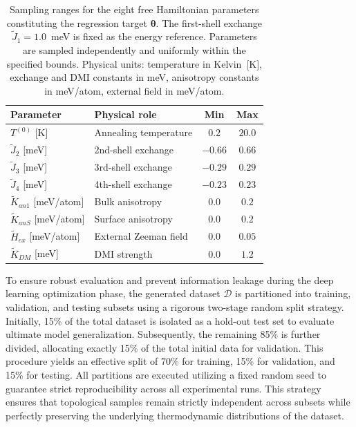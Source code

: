 \documentclass[a4paper,fleqn]{cas-sc}
\begin{document}
\begin{table}[pos=htbp]
\centering
\caption{Sampling ranges for the eight free Hamiltonian 
parameters constituting the regression target 
$\boldsymbol{\theta}$. The first-shell exchange 
$\tilde{J}_1 = 1.0$~meV is fixed as the energy 
reference. Parameters are sampled independently and 
uniformly within the specified bounds. Physical units: 
temperature in Kelvin~[K], exchange and DMI constants 
in meV, anisotropy constants in meV/atom, external 
field in meV/atom.}
\label{tab:param_ranges}
\begin{tabular}{llcc}
\hline
\textbf{Parameter} & \textbf{Physical role} & 
\textbf{Min} & \textbf{Max} \\
\hline
$T^{(0)}$ [K]                & Annealing temperature  & $0.2$  & $20.0$ \\
$\tilde{J}_2$ [meV]          & 2nd-shell exchange     & $-0.66$ & $0.66$  \\
$\tilde{J}_3$ [meV]          & 3rd-shell exchange     & $-0.29$ & $0.29$  \\
$\tilde{J}_4$ [meV]          & 4th-shell exchange     & $-0.23$ & $0.23$  \\
$\tilde{K}_{an1}$ [meV/atom] & Bulk anisotropy        & $0.0$  & $0.2$  \\
$\tilde{K}_{anS}$ [meV/atom] & Surface anisotropy     & $0.0$  & $0.2$  \\
$\tilde{H}_{ex}$ [meV/atom]  & External Zeeman field  & $0.0$  & $0.05$  \\
$\tilde{K}_{DM}$ [meV]       & DMI strength           & $0.0$  & $1.2$  \\
\hline
\end{tabular}
\end{table}

To ensure robust evaluation and prevent information 
leakage during the deep learning optimization phase, 
the generated dataset $\mathcal{D}$ is partitioned 
into training, validation, and testing subsets using 
a rigorous two-stage random split strategy. Initially, 
15\% of the total dataset is isolated as a hold-out 
test set to evaluate ultimate model generalization. 
Subsequently, the remaining 85\% is further divided, 
allocating exactly 15\% of the total initial data 
for validation. This procedure yields an effective 
split of 70\% for training, 15\% for validation, 
and 15\% for testing. All partitions are executed 
utilizing a fixed random seed to guarantee strict 
reproducibility across all experimental runs. This 
strategy ensures that topological samples remain 
strictly independent across subsets while perfectly 
preserving the underlying thermodynamic distributions 
of the dataset.
\end{document}
